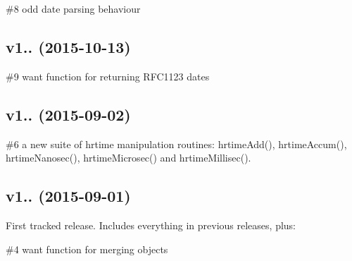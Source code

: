 \begin{DoxyItemize}
\item \#8 odd date parsing behaviour
\end{DoxyItemize}

\subsection*{v1.. (2015-\/10-\/13)}


\begin{DoxyItemize}
\item \#9 want function for returning R\+F\+C1123 dates
\end{DoxyItemize}

\subsection*{v1.. (2015-\/09-\/02)}


\begin{DoxyItemize}
\item \#6 a new suite of hrtime manipulation routines\+: {\ttfamily hrtime\+Add()}, {\ttfamily hrtime\+Accum()}, {\ttfamily hrtime\+Nanosec()}, {\ttfamily hrtime\+Microsec()} and {\ttfamily hrtime\+Millisec()}.
\end{DoxyItemize}

\subsection*{v1.. (2015-\/09-\/01)}

First tracked release. Includes everything in previous releases, plus\+:


\begin{DoxyItemize}
\item \#4 want function for merging objects 
\end{DoxyItemize}